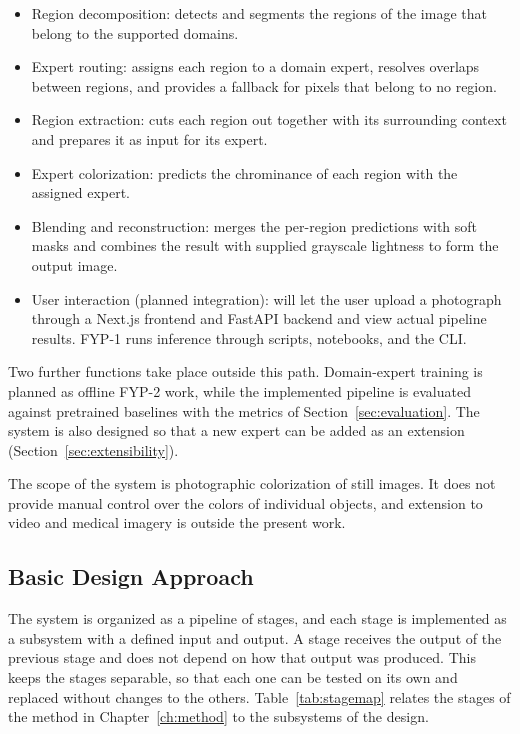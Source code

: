 \documentclass{FastFyp}
\begin{document}
\begin{itemize}
    \item Region decomposition: detects and segments the regions of the image that belong to the supported domains.
    \item Expert routing: assigns each region to a domain expert, resolves overlaps between regions, and provides a fallback for pixels that belong to no region.
    \item Region extraction: cuts each region out together with its surrounding context and prepares it as input for its expert.
    \item Expert colorization: predicts the chrominance of each region with the assigned expert.
    \item Blending and reconstruction: merges the per-region predictions with soft masks and combines the result with supplied grayscale lightness to form the output image.
    \item User interaction (planned integration): will let the user upload a photograph through a Next.js frontend and FastAPI backend and view actual pipeline results. FYP-1 runs inference through scripts, notebooks, and the CLI.
\end{itemize}

Two further functions take place outside this path. Domain-expert training is planned as offline FYP-2 work, while the implemented pipeline is evaluated against pretrained baselines with the metrics of Section~\ref{sec:evaluation}. The system is also designed so that a new expert can be added as an extension (Section~\ref{sec:extensibility}).

The scope of the system is photographic colorization of still images. It does not provide manual control over the colors of individual objects, and extension to video and medical imagery is outside the present work.

\subsection{Basic Design Approach}

The system is organized as a pipeline of stages, and each stage is implemented as a subsystem with a defined input and output. A stage receives the output of the previous stage and does not depend on how that output was produced. This keeps the stages separable, so that each one can be tested on its own and replaced without changes to the others. Table~\ref{tab:stagemap} relates the stages of the method in Chapter~\ref{ch:method} to the subsystems of the design.
\end{document}
